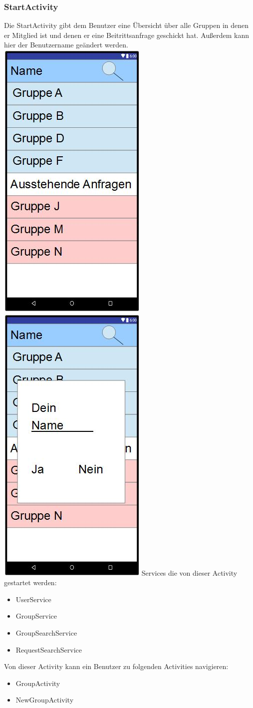 	\subsubsection {StartActivity}
	Die StartActivity gibt dem Benutzer eine Übersicht über alle Gruppen in denen er Mitglied ist und denen er eine Beitrittsanfrage geschickt hat.
	Außerdem kann hier der Benutzername geändert werden.
	\newline
	\includegraphics[width=.3\textwidth]{GUI_Start.jpg}
	\includegraphics[width=.3\textwidth]{GUI_Start2.jpg}
	\newline
	Services die von dieser Activity gestartet werden:
	\begin{itemize}
	\item UserService
	\item GroupService
	\item GroupSearchService
	\item RequestSearchService
	\end{itemize}
	Von dieser Activity kann ein Benutzer zu folgenden Activities navigieren:
	\begin{itemize} 
	\item GroupActivity
	\item NewGroupActivity
	\end{itemize} 
	\newpage
